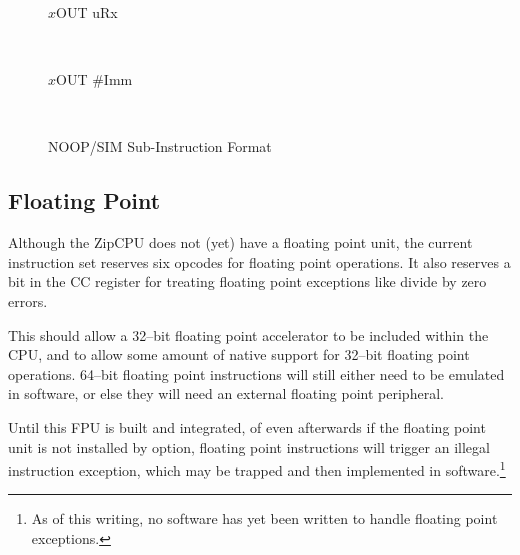 \documentclass{gqtekspec}
\begin{document}
\begin{figure}
\begin{center}
\begin{bytefield}[endianness=big]{32}
\begin{leftwordgroup}{$x$OUT uRx}
		\end{leftwordgroup} \\
\begin{leftwordgroup}{$x$OUT \#Imm}
		\end{leftwordgroup} \\
\end{bytefield}
\caption{NOOP/SIM Sub-Instruction Format}\label{fig:iset-simop}
\end{center}\end{figure}
\subsection{Floating Point}
Although the ZipCPU does not (yet) have a floating point unit, the current
instruction set reserves six opcodes for floating point operations.  It also
reserves a bit in the CC register for treating floating point exceptions like
divide by zero errors.

This should allow a 32--bit floating point accelerator to be included within
the CPU, and to allow some amount of native support for 32--bit floating point
operations.  64--bit floating point instructions will still either need to be
emulated in software, or else they will need an external floating point
peripheral.

Until this FPU is built and integrated, of even afterwards if the floating
point unit is not installed by option, floating point instructions will
trigger an illegal instruction exception, which may be trapped and then
implemented in software.\footnote{As of this writing, no software has yet
been written to handle floating point exceptions.}
\end{document}
